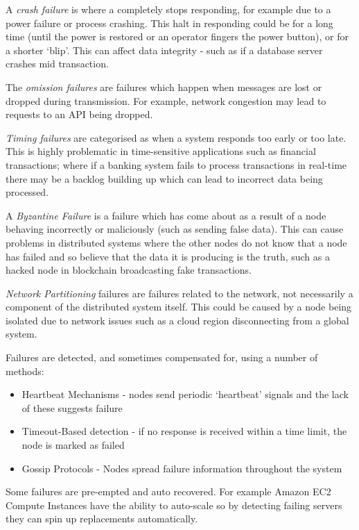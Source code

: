 A \textit{crash failure} is where a completely stops responding, for example due to a power failure or process crashing. This halt in responding could be for a long time (until the power is restored or an operator fingers the power button), or for a shorter `blip'. This can affect data integrity - such as if a database server crashes mid transaction.

The \textit{omission failures} are failures which happen when messages are lost or dropped during transmission. For example, network congestion may lead to requests to an API being dropped. 

\textit{Timing failures} are categorised as when a system responds too early or too late. This is highly problematic in time-sensitive applications such as financial transactions; where if a banking system fails to process transactions in real-time there may be a backlog building up which can lead to incorrect data being processed. 

A \textit{Byzantine Failure} is a failure which has come about as a result of a node behaving incorrectly or maliciously (such as sending false data). This can cause problems in distributed systems where the other nodes do not know that a node has failed and so believe that the data it is producing is the truth, such as a hacked node in blockchain broadcasting fake transactions. 

\textit{Network Partitioning} failures are failures related to the network, not necessarily a component of the distributed system itself. This could be caused by a node being isolated due to network issues such as a cloud region disconnecting from a global system. 

Failures are detected, and sometimes compensated for, using a number of methods:
\begin{itemize}
    \item Heartbeat Mechanisms - nodes send periodic `heartbeat' signals and the lack of these suggests failure
    \item Timeout-Based detection - if no response is received within a time limit, the node is marked as failed
    \item Gossip Protocols - Nodes spread failure information throughout the system
\end{itemize}

Some failures are pre-empted and auto recovered. For example Amazon EC2 Compute Instances have the ability to auto-scale so by detecting failing servers they can spin up replacements automatically. 

